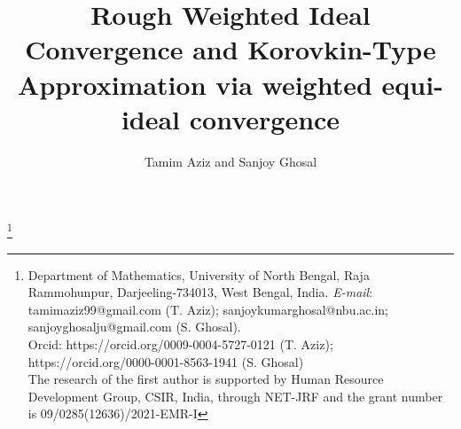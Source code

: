 \documentclass[reqno]{amsart}
\begin{document}
	\theoremstyle{plain}
	\theoremstyle{definition}

\newtheorem{theorem}{Theorem}[section]
\newtheorem{problem}[theorem]{Problem}
\newtheorem{proposition}[theorem]{Proposition}
\newtheorem{corollary}[theorem]{Corollary}
\newtheorem{lemma}[theorem]{Lemma}
\newtheorem{example}[theorem]{Example}
\newtheorem{remark}[theorem]{Remark}
\newtheorem{definition}[theorem]{Definition}
\newtheorem{fact}[theorem]{Fact}
\newtheorem{claim}[theorem]{Claim}
\newtheorem{note}[theorem]{Note}

	\large
	\title[Rough Weighted Ideal Convergence and Korovkin-Type Applications...]{Rough Weighted Ideal Convergence and Korovkin-Type Approximation via weighted equi-ideal convergence}	


	\date{}
	
	
	
	
	\date{}
	
	
\author[Tamim Aziz and Sanjoy Ghosal]{Tamim Aziz and Sanjoy Ghosal}
\thanks{Department of Mathematics, University of North Bengal, Raja Rammohunpur, Darjeeling-734013, West Bengal, India. \emph{E-mail}: tamimaziz99@gmail.com (T. Aziz); sanjoykumarghosal@nbu.ac.in; sanjoyghosalju@gmail.com (S. Ghosal). \\ Orcid: https://orcid.org/0009-0004-5727-0121 (T. Aziz);  https://orcid.org/0000-0001-8563-1941 (S. Ghosal)\\	The research of the first author is supported by Human Resource Development Group, CSIR, India, through NET-JRF and the grant number is 09/0285(12636)/2021-EMR-I}
	
	\setcounter {page}{1}
	
\end{document}
